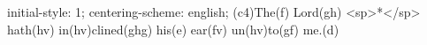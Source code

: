 initial-style: 1;
centering-scheme: english;
(c4)The(f) Lord(gh) <sp>*</sp> hath(hv) in(hv)clined(ghg) his(e) ear(fv) un(hv)to(gf) me.(d)